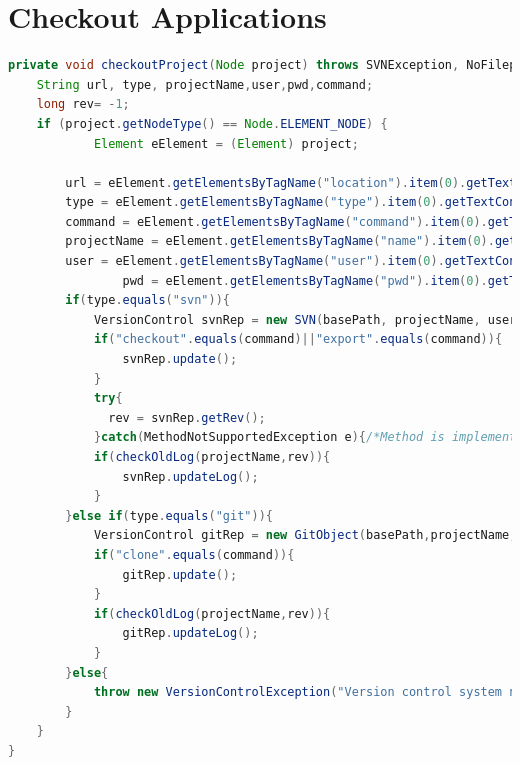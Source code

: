 \documentclass{article}
\begin{document}
\newpage
\section{Checkout Applications}
\label{AppendixD}


\begin{lstlisting}[frame=single ,language=Java,showstringspaces=false]
private void checkoutProject(Node project) throws SVNException, NoFilepatternException,GitAPIException,WrongRepositoryStateException, InvalidConfigurationException, DetachedHeadException, InvalidRemoteException, CanceledException, RefNotFoundException, NoHeadException,IOException {
	String url, type, projectName,user,pwd,command;
	long rev= -1;
	if (project.getNodeType() == Node.ELEMENT_NODE) {
			Element eElement = (Element) project;

		url = eElement.getElementsByTagName("location").item(0).getTextContent();
		type = eElement.getElementsByTagName("type").item(0).getTextContent();
		command = eElement.getElementsByTagName("command").item(0).getTextContent();
		projectName = eElement.getElementsByTagName("name").item(0).getTextContent();
		user = eElement.getElementsByTagName("user").item(0).getTextContent();
                pwd = eElement.getElementsByTagName("pwd").item(0).getTextContent();	
		if(type.equals("svn")){
			VersionControl svnRep = new SVN(basePath, projectName, user,pwd,url,command);
			if("checkout".equals(command)||"export".equals(command)){
			 	svnRep.update();
			}	
			try{	
			  rev = svnRep.getRev();
			}catch(MethodNotSupportedException e){/*Method is implemented for SVN*/}
			if(checkOldLog(projectName,rev)){
				svnRep.updateLog();
			}
		}else if(type.equals("git")){
			VersionControl gitRep = new GitObject(basePath,projectName,url,user,pwd);
			if("clone".equals(command)){
				gitRep.update();
			}
			if(checkOldLog(projectName,rev)){
				gitRep.updateLog();
			}
		}else{
			throw new VersionControlException("Version control system not found");
		}
	}	
}
\end{lstlisting}
\end{document}
